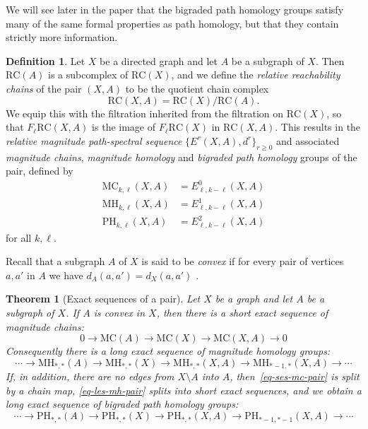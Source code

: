 \documentclass[a4paper, 11 pt, oneside, reqno]{amsart}
\numberwithin{lemma}{section}
\newtheorem{theorem}[lemma]{Theorem}
\theoremstyle{definition}
\newtheorem{definition}[lemma]{Definition}
\newcommand{\demph}[1]{\emph{#1}}
\newcommand{\RC}{\mathrm{RC}}
\newcommand{\MC}{\mathrm{MC}}
\newcommand{\MH}{\mathrm{MH}}
\newcommand{\PH}{\mathrm{PH}}
\begin{document}
We will see later in the paper that the bigraded path homology
groups satisfy many of the same formal properties as 
path homology, but that they contain strictly more information.

\begin{definition}
\label{def:relative_MPSS}
    Let $X$ be a directed graph and let $A$ be a subgraph of $X$.
    Then $\RC(A)$ is a subcomplex of $\RC(X)$,
    and we define the \emph{relative reachability chains}
    of the pair $(X,A)$ to be the quotient chain complex
    \[
        \RC(X,A) = \RC(X)/\RC(A).
    \]
    We equip this with the filtration inherited from the
    filtration on $\RC(X)$, so that
    $F_\ell\RC(X,A)$ is the image of $F_\ell\RC(X)$
    in $\RC(X,A)$.
    This results in the 
    \emph{relative magnitude path-spectral sequence}
    $\{E^r(X,A),d^r\}_{r\geq 0}$
    and associated \emph{magnitude chains},
    \emph{magnitude homology} and
    \emph{bigraded path homology} groups of the pair,
    defined by
    \begin{align*}
        \MC_{k,\ell}(X,A) &=  E^0_{\ell,k-\ell}(X,A)
        \\
        \MH_{k,\ell}(X,A) &=  E^1_{\ell,k-\ell}(X,A)
        \\
        \PH_{k,\ell}(X,A) &=  E^2_{\ell,k-\ell}(X,A)
    \end{align*}
    for all $k,\ell$.
\end{definition}

Recall that a subgraph \(A\) of \(X\) is said to be \demph{convex} if for every pair of vertices \(a,a'\) in \(A\) we have \(d_A(a,a') = d_X(a,a')\) \cite[Definition 4.2]{LeinsterGraph}.

\begin{theorem}[Exact sequences of a pair]
\label{thm:les-pair}
    Let $X$ be a graph and let $A$ be a subgraph of $X$.
    If $A$ is convex in $X$, then there is 
    a short exact sequence of magnitude chains: 
    \begin{equation}\label{eq-ses-mc-pair}
        0
        \to
        \MC(A)
        \to
        \MC(X)
        \to
        \MC(X,A)
        \to
        0
    \end{equation}
    Consequently there is a long exact sequence
    of magnitude homology groups:
    \begin{equation}\label{eq-les-mh-pair}
        \cdots
        \to
        \MH_{\ast,\ast}(A)
        \to
        \MH_{\ast,\ast}(X)
        \to
        \MH_{\ast,\ast}(X,A)
        \to
        \MH_{\ast-1,\ast}(X,A)
        \to
        \cdots
    \end{equation}
    If, in addition, there are no edges from $X\setminus A$ into $A$,
    then~\eqref{eq-ses-mc-pair} is split by a chain map,
    \eqref{eq-les-mh-pair} splits into short exact sequences,
    and we obtain a long exact sequence
    of bigraded path homology groups:
    \begin{equation}\label{eq-les-ph-pair}
        \cdots
        \to
        \PH_{\ast,\ast}(A)
        \to
        \PH_{\ast,\ast}(X)
        \to
        \PH_{\ast,\ast}(X,A)
        \to
        \PH_{\ast-1,\ast-1}(X,A)
        \to
        \cdots
    \end{equation}  
\end{theorem}
\end{document}
